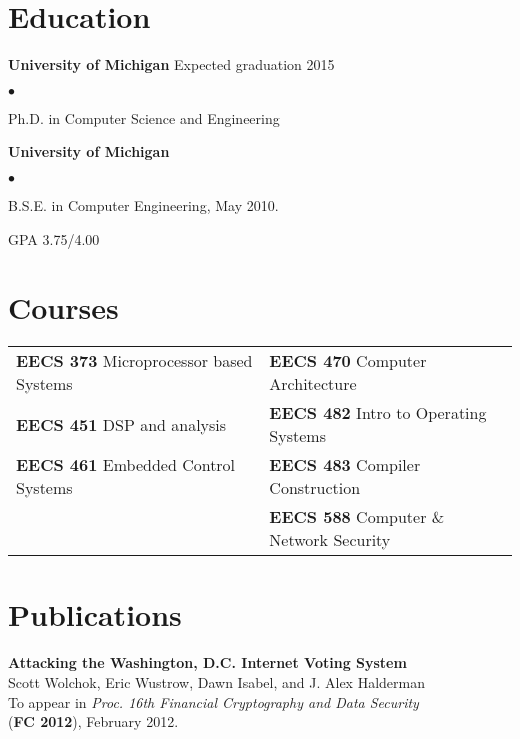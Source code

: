 \documentclass{res}
\newcommand{\sqitem}{\item[\tiny$\blacksquare$]}
\newcommand{\sqlist}{\begin{list}{$\bullet$}
  { \setlength{\itemsep}{0pt}
	\setlength{\parsep}{0pt}
	\setlength{\topsep}{0pt}
	\setlength{\partopsep}{0pt}
	\setlength{\leftmargin}{6.0em}
	\setlength{\labelsep}{2.5em} } }
\newcommand{\sqend}{\end{list}}
\begin{document}

\address{\emph{Current Address}	\\
			1885 Fuller Rd	\\
			Ann Arbor, MI 48105			\\
										\\
			phone: 734.330.8702			\\
			email: ewust@umich.edu}

\begin{resume}

\section{Education}
	\textbf{University of Michigan}  Expected graduation 2015%
	\sqlist	
		\sqitem Ph.D. in Computer Science and Engineering 
	\sqend

	\textbf{University of Michigan}
	\sqlist
		\sqitem B.S.E. in Computer Engineering, May 2010.
		\sqitem GPA 3.75/4.00
	\sqend

\section{Courses}
	\begin{tabular}{l l}
	\textbf{EECS 373} Microprocessor based Systems & 
					\textbf{EECS 470} Computer Architecture \\
	\textbf{EECS 451} DSP and analysis & 
					\textbf{EECS 482} Intro to Operating Systems \\
	\textbf{EECS 461} Embedded Control Systems & 
					\textbf{EECS 483} Compiler Construction \\
											  &
					\textbf{EECS 588} Computer \& Network Security \\
	\end{tabular}
\fi

\section{Publications}

    \textbf{Attacking the Washington, D.C. Internet Voting System} \\
    Scott Wolchok, Eric Wustrow, Dawn Isabel, and J. Alex Halderman \\
    To appear in \emph{Proc. 16th Financial Cryptography and Data Security} \\
    (\textbf{FC 2012}), February 2012.


\end{resume}
\end{document}
